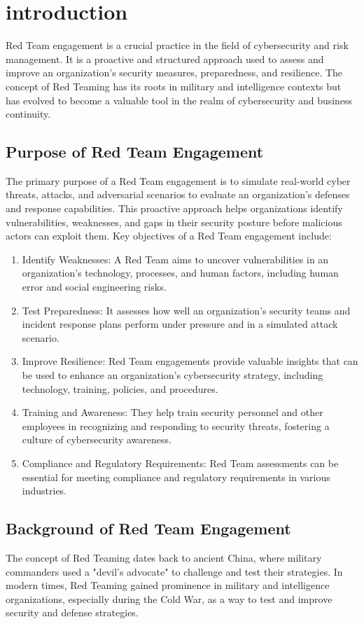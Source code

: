 \section{introduction}
Red Team engagement is a crucial practice in the field of cybersecurity and risk management. It is a proactive and structured approach used to assess and improve an organization's security measures, preparedness, and resilience. The concept of Red Teaming has its roots in military and intelligence contexts but has evolved to become a valuable tool in the realm of cybersecurity and business continuity.

\subsection{Purpose of Red Team Engagement}
The primary purpose of a Red Team engagement is to simulate real-world cyber threats, attacks, and adversarial scenarios to evaluate an organization's defenses and response capabilities. This proactive approach helps organizations identify vulnerabilities, weaknesses, and gaps in their security posture before malicious actors can exploit them. Key objectives of a Red Team engagement include:
\begin{enumerate}

\item Identify Weaknesses: A Red Team aims to uncover vulnerabilities in an organization's technology, processes, and human factors, including human error and social engineering risks.
\item Test Preparedness: It assesses how well an organization's security teams and incident response plans perform under pressure and in a simulated attack scenario.
\item Improve Resilience: Red Team engagements provide valuable insights that can be used to enhance an organization's cybersecurity strategy, including technology, training, policies, and procedures.
\item Training and Awareness: They help train security personnel and other employees in recognizing and responding to security threats, fostering a culture of cybersecurity awareness.
\item Compliance and Regulatory Requirements: Red Team assessments can be essential for meeting compliance and regulatory requirements in various industries.

\end{enumerate}

\newpage
\subsection{Background of Red Team Engagement}
The concept of Red Teaming dates back to ancient China, where military commanders used a "devil's advocate" to challenge and test their strategies. In modern times, Red Teaming gained prominence in military and intelligence organizations, especially during the Cold War, as a way to test and improve security and defense strategies.


